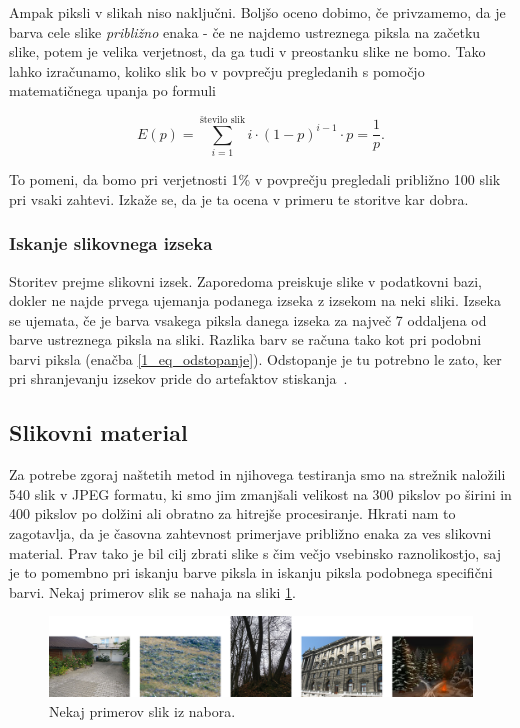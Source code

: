 Ampak piksli v slikah niso naključni.
Boljšo oceno dobimo, če privzamemo, da je barva cele slike \emph{približno} enaka - če ne najdemo ustreznega piksla na začetku slike, potem je velika verjetnost, da ga tudi v preostanku slike ne bomo.
Tako lahko izračunamo, koliko slik bo v povprečju pregledanih s pomočjo matematičnega upanja po formuli

\begin{equation} \label{1_eq_upanje}
E(p) = \sum_{i = 1}^{\text{število slik}} i \cdot (1 - p)^{i - 1} \cdot p = \frac{1}{p} .
\end{equation}

To pomeni, da bomo pri verjetnosti 1\% v povprečju pregledali približno 100 slik pri vsaki zahtevi.
Izkaže se, da je ta ocena v primeru te storitve kar dobra.

\subsubsection{Iskanje slikovnega izseka}

Storitev prejme slikovni izsek.
Zaporedoma preiskuje slike v podatkovni bazi, dokler ne najde prvega ujemanja podanega izseka z izsekom na neki sliki.
Izseka se ujemata, če je barva vsakega piksla danega izseka za največ 7 oddaljena od barve ustreznega piksla na sliki.
Razlika barv se računa tako kot pri podobni barvi piksla (enačba \ref{1_eq_odstopanje}).
Odstopanje je tu potrebno le zato, ker pri shranjevanju izsekov pride do artefaktov stiskanja~\cite{1_wiki_compression}.

\subsection{Slikovni material}

Za potrebe zgoraj naštetih metod in njihovega testiranja smo na strežnik naložili 540 slik v JPEG formatu, ki smo jim zmanjšali velikost na 300 pikslov po širini in 400 pikslov po dolžini ali obratno za hitrejše procesiranje.
Hkrati nam to zagotavlja, da je časovna zahtevnost primerjave približno enaka za ves slikovni material.
Prav tako je bil cilj zbrati slike s čim večjo vsebinsko raznolikostjo, saj je to pomembno pri iskanju barve piksla in iskanju piksla podobnega specifični barvi.
Nekaj primerov slik se nahaja na sliki \ref{fig:1_sample_images}.

\begin{figure}[H]
    \centering
    \includegraphics[scale=0.16]{Img/1_sample_images.png}
    \caption{Nekaj primerov slik iz nabora.}
    \label{fig:1_sample_images}
\end{figure}

